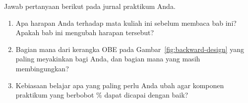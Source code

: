 \begin{refleksibox}
Jawab pertanyaan berikut pada jurnal praktikum Anda.
\begin{enumerate}
    \item Apa harapan Anda terhadap mata kuliah ini sebelum membaca
          bab ini? Apakah bab ini mengubah harapan tersebut?
    \item Bagian mana dari kerangka OBE pada
          Gambar~\ref{fig:backward-design} yang paling meyakinkan
          bagi Anda, dan bagian mana yang masih membingungkan?
    \item Kebiasaan belajar apa yang paling perlu Anda ubah agar
          komponen praktikum yang berbobot \% dapat dicapai
          dengan baik?
\end{enumerate}
\end{refleksibox}
